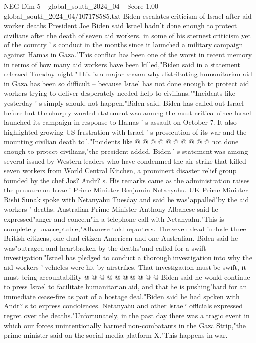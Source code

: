 \begin{textsample}{NEG Dim 5 – global\_south\_2024\_04 – Score 1.00 – global\_south\_2024\_04/107178585.txt}  \label{ex:f5_neg_117}
Biden escalates criticism of Israel after aid worker deaths President Joe Biden said Israel hadn't done enough to protect civilians after the death of seven aid workers, in some of his sternest criticism yet of the country ' s conduct in the months since it launched a military campaign against Hamas in Gaza."This conflict has been one of the worst in recent memory in terms of how many aid workers have been killed,"Biden said in a statement released Tuesday night."This is a major reason why distributing humanitarian aid in Gaza has been so difficult -- because Israel has not done enough to protect aid workers trying to deliver desperately needed help to civilians.""Incidents like yesterday ' s simply should not happen,"Biden said.
Biden has called out Israel before but the sharply worded statement was among the most critical since Israel launched its campaign in response to Hamas ' s assault on October 7.
It also highlighted growing US frustration with Israel ' s prosecution of its war and the mounting civilian death toll."Incidents like @ @ @ @ @ @ @ @ @ @ not done enough to protect civilians,"the president added.
Biden ' s statement was among several issued by Western leaders who have condemned the air strike that killed seven workers from World Central Kitchen, a prominent disaster relief group founded by the chef Jos?
Andr? s.
His remarks came as the administration raises the pressure on Israeli Prime Minister Benjamin Netanyahu.
UK Prime Minister Rishi Sunak spoke with Netanyahu Tuesday and said he was"appalled"by the aid workers ' deaths.
Australian Prime Minister Anthony Albanese said he expressed"anger and concern"in a telephone call with Netanyahu."This is completely unacceptable,"Albanese told reporters.
The seven dead include three British citizens, one dual-citizen American and one Australian.
Biden said he was"outraged and heartbroken by the deaths"and called for a swift investigation."Israel has pledged to conduct a thorough investigation into why the aid workers ' vehicles were hit by airstrikes.
That investigation must be swift, it must bring accountability @ @ @ @ @ @ @ @ @ @ Biden said he would continue to press Israel to facilitate humanitarian aid, and that he is pushing"hard for an immediate cease-fire as part of a hostage deal."Biden said he had spoken with Andr? s to express condolences.
Netanyahu and other Israeli officials expressed regret over the deaths."Unfortunately, in the past day there was a tragic event in which our forces unintentionally harmed non-combatants in the Gaza Strip,"the prime minister said on the social media platform X."This happens in war.

\end{textsample}
